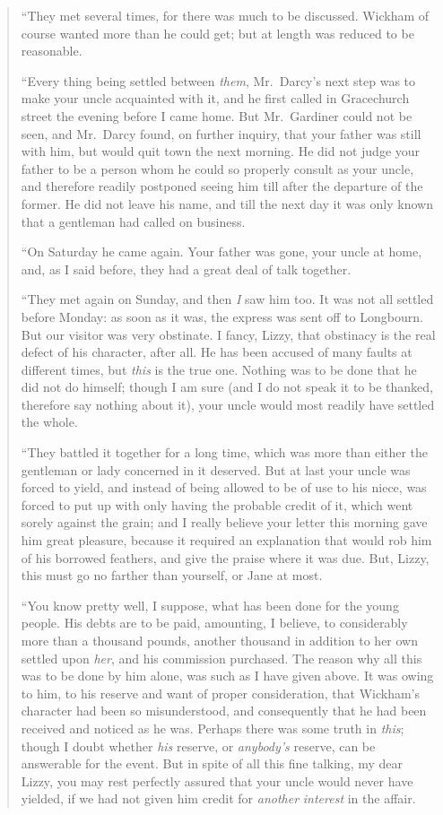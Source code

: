 \documentclass[12pt,english,oneside]{book}
\begin{document}
\begin{quotation}
{}``They met several times, for there was much to be discussed. Wickham
of course wanted more than he could get; but at length was reduced
to be reasonable.

{}``Every thing being settled between \textit{them}, Mr.\ Darcy's
next step was to make your uncle acquainted with it, and he first
called in Gracechurch street the evening before I came home. But Mr.\ Gardiner
could not be seen, and Mr.\ Darcy found, on further inquiry, that
your father was still with him, but would quit town the next morning.
He did not judge your father to be a person whom he could so properly
consult as your uncle, and therefore readily postponed seeing him
till after the departure of the former. He did not leave his name,
and till the next day it was only known that a gentleman had called
on business.

{}``On Saturday he came again. Your father was gone, your uncle at
home, and, as I said before, they had a great deal of talk together.

{}``They met again on Sunday, and then \textit{I} saw him too. It
was not all settled before Monday: as soon as it was, the express
was sent off to Longbourn. But our visitor was very obstinate. I fancy,
Lizzy, that obstinacy is the real defect of his character, after all.
He has been accused of many faults at different times, but \textit{this}
is the true one. Nothing was to be done that he did not do himself;
though I am sure (and I do not speak it to be thanked, therefore say
nothing about it), your uncle would most readily have settled the
whole.

{}``They battled it together for a long time, which was more than
either the gentleman or lady concerned in it deserved. But at last
your uncle was forced to yield, and instead of being allowed to be
of use to his niece, was forced to put up with only having the probable
credit of it, which went sorely against the grain; and I really believe
your letter this morning gave him great pleasure, because it required
an explanation that would rob him of his borrowed feathers, and give
the praise where it was due. But, Lizzy, this must go no farther than
yourself, or Jane at most.

{}``You know pretty well, I suppose, what has been done for the young
people. His debts are to be paid, amounting, I believe, to considerably
more than a thousand pounds, another thousand in addition to her own
settled upon \textit{her}, and his commission purchased. The reason
why all this was to be done by him alone, was such as I have given
above. It was owing to him, to his reserve and want of proper consideration,
that Wickham's character had been so misunderstood, and consequently
that he had been received and noticed as he was. Perhaps there was
some truth in \textit{this}; though I doubt whether \textit{his} reserve,
or \textit{anybody's} reserve, can be answerable for the event. But
in spite of all this fine talking, my dear Lizzy, you may rest perfectly
assured that your uncle would never have yielded, if we had not given
him credit for \textit{another} \textit{interest} in the affair.


\end{quotation}
\end{document}
